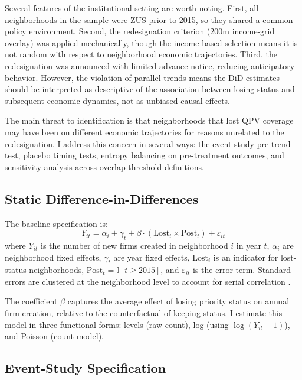 \documentclass[12pt]{article}
\newcommand{\ind}{\mathbb{I}}
\begin{document}
Several features of the institutional setting are worth noting. First, all neighborhoods in the sample were ZUS prior to 2015, so they shared a common policy environment. Second, the redesignation criterion (200m income-grid overlay) was applied mechanically, though the income-based selection means it is not random with respect to neighborhood economic trajectories. Third, the redesignation was announced with limited advance notice, reducing anticipatory behavior. However, the violation of parallel trends means the DiD estimates should be interpreted as descriptive of the association between losing status and subsequent economic dynamics, not as unbiased causal effects.

The main threat to identification is that neighborhoods that lost QPV coverage may have been on different economic trajectories for reasons unrelated to the redesignation. I address this concern in several ways: the event-study pre-trend test, placebo timing tests, entropy balancing on pre-treatment outcomes, and sensitivity analysis across overlap threshold definitions.

\subsection{Static Difference-in-Differences}

The baseline specification is:
\begin{equation}
Y_{it} = \alpha_i + \gamma_t + \beta \cdot (\text{Lost}_i \times \text{Post}_t) + \varepsilon_{it}
\label{eq:did}
\end{equation}
where $Y_{it}$ is the number of new firms created in neighborhood $i$ in year $t$, $\alpha_i$ are neighborhood fixed effects, $\gamma_t$ are year fixed effects, $\text{Lost}_i$ is an indicator for lost-status neighborhoods, $\text{Post}_t = \ind[t \geq 2015]$, and $\varepsilon_{it}$ is the error term. Standard errors are clustered at the neighborhood level to account for serial correlation \citep{roth2023pretest}.

The coefficient $\beta$ captures the average effect of losing priority status on annual firm creation, relative to the counterfactual of keeping status. I estimate this model in three functional forms: levels (raw count), log (using $\log(Y_{it} + 1)$), and Poisson (count model).

\subsection{Event-Study Specification}
\end{document}
